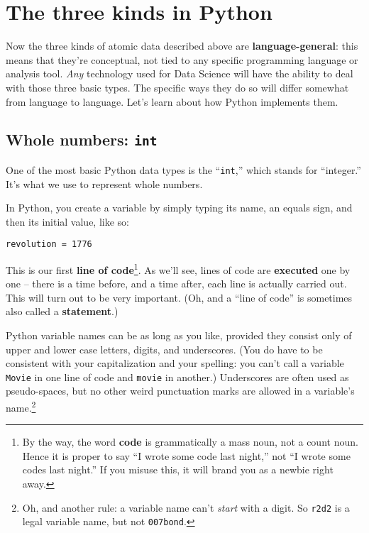 \section{The three kinds in Python}

Now the three kinds of atomic data described above are
\textbf{language-general}: this means that they're conceptual, not tied to any
specific programming language or analysis tool. \textit{Any} technology used
for Data Science will have the ability to deal with those three basic types.
The specific ways they do so will differ somewhat from language to language.
Let's learn about how Python implements them.

\subsection{Whole numbers: \texttt{int}}

One of the most basic Python data types is the ``\texttt{int},'' which stands
for ``integer.'' It's what we use to represent whole numbers.

In Python, you create a variable by simply typing its name, an equals sign, and
then its initial value, like so:

\begin{Verbatim}[fontsize=\small,samepage=true,frame=single,framesep=3mm]
revolution = 1776
\end{Verbatim}

This is our first \textbf{line of code}\footnote{By the way, the word
\textbf{code} is grammatically a mass noun, not a count noun. Hence it is
proper to say ``I wrote some code last night,'' not ``I wrote some codes last
night.'' If you misuse this, it will brand you as a newbie right away.}. As
we'll see, lines of code are \textbf{executed} one by one -- there is a time
before, and a time after, each line is actually carried out. This will turn out
to be very important. (Oh, and a ``line of code'' is sometimes also called a
\textbf{statement}.)


Python variable names can be as long as you like, provided they consist only of
upper and lower case letters, digits, and underscores. (You do have to be
consistent with your capitalization and your spelling: you can't call a
variable \texttt{Movie} in one line of code and \texttt{movie} in another.)
Underscores are often used as pseudo-spaces, but no other weird punctuation
marks are allowed in a variable's name.\footnote{Oh, and another rule: a
variable name can't \textit{start} with a digit. So \texttt{r2d2} is a legal
variable name, but not \texttt{007bond}.}

